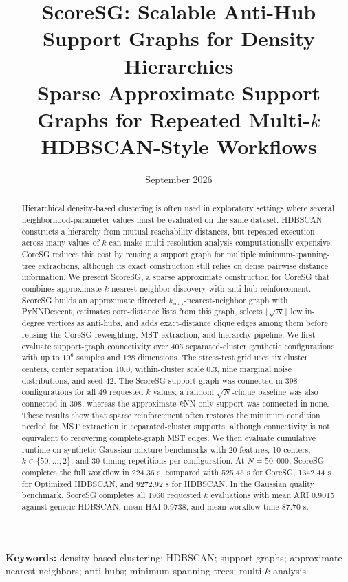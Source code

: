 \documentclass[11pt]{article}
\title{\textbf{ScoreSG: Scalable Anti-Hub Support Graphs for Density Hierarchies}\\
\large Sparse Approximate Support Graphs for Repeated Multi-\(k\) HDBSCAN-Style Workflows}
\author{}
\date{\small September 2026}
\newcommand{\keywords}[1]{%
  \vspace{0.75em}
  \begin{center}
  \begin{minipage}{0.88\textwidth}
  \small\noindent\textbf{Keywords:} #1
  \end{minipage}
  \end{center}
}
\begin{document}
\maketitle

\begin{abstract}
Hierarchical density-based clustering is often used in exploratory settings where several neighborhood-parameter values must be evaluated on the same dataset. HDBSCAN constructs a hierarchy from mutual-reachability distances, but repeated execution across many values of \(k\) can make multi-resolution analysis computationally expensive. CoreSG reduces this cost by reusing a support graph for multiple minimum-spanning-tree extractions, although its exact construction still relies on dense pairwise distance information. We present ScoreSG, a sparse approximate construction for CoreSG that combines approximate \(k\)-nearest-neighbor discovery with anti-hub reinforcement. ScoreSG builds an approximate directed \(k_{\max}\)-nearest-neighbor graph with PyNNDescent, estimates core-distance lists from this graph, selects \(\lfloor\sqrt{N}\rfloor\) low in-degree vertices as anti-hubs, and adds exact-distance clique edges among them before reusing the CoreSG reweighting, MST extraction, and hierarchy pipeline. We first evaluate support-graph connectivity over 405 separated-cluster synthetic configurations with up to \(10^6\) samples and 128 dimensions. The stress-test grid uses six cluster centers, center separation 10.0, within-cluster scale 0.3, nine marginal noise distributions, and seed 42. The ScoreSG support graph was connected in 398 configurations for all 49 requested \(k\) values; a random \(\sqrt{N}\)-clique baseline was also connected in 398, whereas the approximate \(k\)NN-only support was connected in none. These results show that sparse reinforcement often restores the minimum condition needed for MST extraction in separated-cluster supports, although connectivity is not equivalent to recovering complete-graph MST edges. We then evaluate cumulative runtime on synthetic Gaussian-mixture benchmarks with 20 features, 10 centers, \(k \in \{50,\ldots,2\}\), and 30 timing repetitions per configuration. At \(N=50{,}000\), ScoreSG completes the full workflow in 224.36 s, compared with 525.45 s for CoreSG, 1342.44 s for Optimized HDBSCAN, and 9272.92 s for HDBSCAN. In the Gaussian quality benchmark, ScoreSG completes all 1960 requested \(k\) evaluations with mean ARI 0.9015 against generic HDBSCAN, mean HAI 0.9738, and mean workflow time 87.70 s.
\end{abstract}
\keywords{density-based clustering; HDBSCAN; support graphs; approximate nearest neighbors; anti-hubs; minimum spanning trees; multi-\(k\) analysis}
\end{document}
